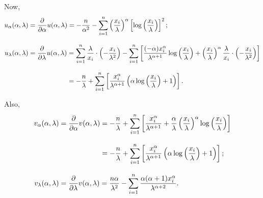 \documentclass[11pt, a4paper]{article}\usepackage[]{graphicx}\usepackage[]{xcolor}
\begin{document}
\newpage

Now,
\begin{align*}
u_{\alpha}(\alpha, \lambda) &= \dfrac{\partial}{\partial \alpha} u(\alpha, \lambda) = -\dfrac{n}{\alpha^2} - \sum \limits_{i=1}^{n} \left( \dfrac{x_i}{\lambda} \right)^{\alpha} \left[ \log \left( \dfrac{x_i}{\lambda} \right) \right]^2;\\[0.3cm]
u_{\lambda}(\alpha, \lambda) &= \dfrac{\partial}{\partial \lambda} u(\alpha, \lambda) =
\sum \limits_{i=1}^{n} \dfrac{\lambda}{x_i} \cdot \left( -\dfrac{x_i}{\lambda^2} \right)
- \sum \limits_{i=1}^{n} \left[\dfrac{(-\alpha) x_i^{\alpha}}{\lambda^{\alpha + 1}} \log \left( \dfrac{x_i}{\lambda} \right) + \left( \dfrac{x_i}{\lambda} \right)^{\alpha}\dfrac{\lambda}{x_i} \cdot \left( -\dfrac{x_i}{\lambda^2} \right) \right]\\[0.3cm]
&\phantom{= \frac{\partial}{\partial \lambda} u(\alpha, \lambda) \hspace{0.1cm}} = -\dfrac{n}{\lambda} + \sum \limits_{i=1}^{n} \left[\dfrac{x_i^{\alpha}}{\lambda^{\alpha + 1}} \left( \alpha \log \left( \dfrac{x_i}{\lambda} \right) + 1 \right) \right].
\end{align*}

Also,
\begin{align*}
v_{\alpha}(\alpha, \lambda) &= \dfrac{\partial}{\partial \alpha} v(\alpha, \lambda) =
-\dfrac{n}{\lambda} + \sum \limits_{i=1}^{n} \left[\dfrac{x_i^{\alpha}}{\lambda^{\alpha + 1}}
+ \dfrac{\alpha}{\lambda} \left( \dfrac{x_i}{\lambda} \right)^{\alpha} \log \left( \dfrac{x_i}{\lambda} \right) \right]\\[0.3cm]
&\phantom{= \frac{\partial}{\partial \alpha} v(\alpha, \lambda) \hspace{0.1cm}} =
-\dfrac{n}{\lambda} + \sum \limits_{i=1}^{n} \left[\dfrac{x_i^{\alpha}}{\lambda^{\alpha + 1}}
\left( \alpha \log \left( \dfrac{x_i}{\lambda} \right) + 1 \right) \right];\\[0.3cm]
v_{\lambda}(\alpha, \lambda) &= \dfrac{\partial}{\partial \lambda} v(\alpha, \lambda) =
\dfrac{n \alpha}{\lambda^2} - \sum \limits_{i=1}^{n} \dfrac{\alpha(\alpha + 1) x_i^{\alpha}}{\lambda^{\alpha + 2}}.
\end{align*}
\end{document}

